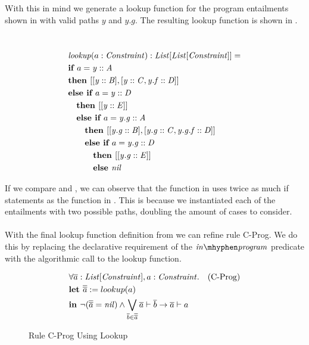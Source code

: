 With this in mind we generate a lookup function for the
program entailments shown in 
with valid paths $y$ and $y.g$.
The resulting lookup function is shown in .
\newpage
\begin{example}\quad\\
\label{ex:lookup-fun}
\begin{align*}
&\mathit{lookup}(a: \mathit{Constraint}): \mathit{List[\mathit{List[\mathit{Constraint}]}]} = \\
&\textbf{if } a = \mathit{y} :: \mathit{A}\\
&\textbf{then } [[\mathit{y} :: \mathit{B}], [\mathit{y} :: \mathit{C}, \mathit{y.f} :: \mathit{D}]]\\
&\textbf{else } \textbf{if } a = \mathit{y} :: \mathit{D}\\
&\quad \textbf{then } [[\mathit{y} :: \mathit{E}]]\\
&\quad \textbf{else } \textbf{if } a = \mathit{y.g} :: \mathit{A}\\
&\qquad \textbf{then } [[\mathit{y.g} :: \mathit{B}], [\mathit{y.g} :: \mathit{C}, \mathit{y.g.f} :: \mathit{D}]]\\
&\qquad \textbf{else } \textbf{if } a = \mathit{y.g} :: \mathit{D} \\
&\qquad\quad \textbf{then } [[\mathit{y.g} :: \mathit{E}]]\\
&\qquad\quad \textbf{else } \mathit{nil}
\end{align*}
\end{example}
If we compare  and ,
we can observe that the function in  uses
twice as much if statements as the function in .
This is because we instantiated each of the entailments with two possible paths,
doubling the amount of cases to consider.\\
\\
With the final lookup function definition from 
we can refine rule \mbox{C-Prog}.
We do this by replacing the declarative requirement of the $\inprog$ predicate
with the algorithmic call to the lookup function.
%
\begin{figure}[h]
\begin{align*}
&\forall \ovl a: \Constrs, a: \Constr. && \text{(C-Prog)}\\
&\Let \ovl{\ovl a} := lookup(a)\\   %
&\In
     \neg (\ovl{\ovl a} = \nil)
   \land
     \bigvee_{\ovl b \in \ovl{\ovl a}}{\entails{\ovl a}{\ovl b}}
   \rightarrow \entails{\ovl a}{a}
\end{align*}
\caption{Rule C-Prog Using Lookup}
\label{fig:axioms-cprog}
\end{figure}\\\\
